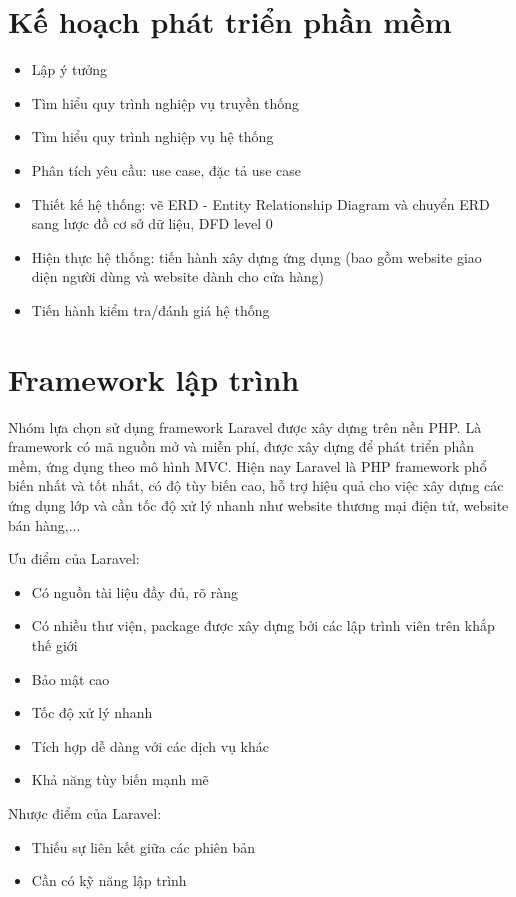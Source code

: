 \documentclass[12pt,a4paper,2sides]{report}
\begin{document}
\section{Kế hoạch phát triển phần mềm}
\begin{itemize}
    \item Lập ý tưởng
    \item Tìm hiểu quy trình nghiệp vụ truyền thống
    \item Tìm hiểu quy trình nghiệp vụ hệ thống
    \item Phân tích yêu cầu: use case, đặc tả use case
    \item Thiết kế hệ thống: vẽ ERD - Entity Relationship Diagram và chuyển ERD sang lược đồ cơ sở dữ liệu, DFD level 0
    \item Hiện thực hệ thống: tiến hành xây dựng ứng dụng (bao gồm website giao diện người dùng và website dành cho cửa hàng)
    \item Tiến hành kiểm tra/đánh giá hệ thống
\end{itemize}
\section{Framework lập trình}

\hspace{0.7cm} Nhóm lựa chọn sử dụng framework Laravel được xây dựng trên nền PHP. Là framework có mã nguồn mở và miễn phí, được xây dựng để phát triển phần mềm, ứng dụng theo mô hình MVC. Hiện nay Laravel là PHP framework phổ biến nhất và tốt nhất, có độ tùy biến cao, hỗ trợ hiệu quả cho việc xây dựng các ứng dụng lớp và cần tốc độ xử lý nhanh như website thương mại điện tử, website bán hàng,...

Ưu điểm của Laravel:
\begin{itemize}
    \item Có nguồn tài liệu đầy đủ, rõ ràng
    \item Có nhiều thư viện, package được xây dựng bởi các lập trình viên trên khắp thế giới
    \item Bảo mật cao
    \item Tốc độ xử lý nhanh
    \item Tích hợp dễ dàng với các dịch vụ khác
    \item Khả năng tùy biến mạnh mẽ
\end{itemize}

Nhược điểm  của Laravel:
\begin{itemize}
    \item Thiếu sự liên kết giữa các phiên bản
    \item Cần có kỹ năng lập trình
\end{itemize}
\end{document}
